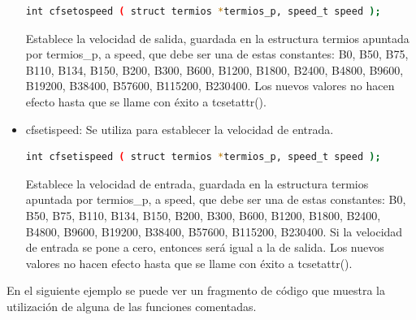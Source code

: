 \documentclass[12pt,twoside]{book}
\begin{document}
\begin{itemize}
\begin{lstlisting}[language=bash]
int cfsetospeed ( struct termios *termios_p, speed_t speed );
\end{lstlisting}
Establece la velocidad de salida, guardada en la estructura termios
apuntada por termios\_p, a speed, que debe ser una de estas constantes:
B0, B50, B75, B110, B134, B150, B200, B300, B600, B1200, B1800,
B2400, B4800, B9600, B19200, B38400, B57600, B115200, B230400.
Los nuevos valores no hacen efecto hasta que se llame con éxito a
tcsetattr().

\item cfsetispeed: Se utiliza para establecer la velocidad de entrada.

\begin{lstlisting}[language=bash]
int cfsetispeed ( struct termios *termios_p, speed_t speed );
\end{lstlisting}
Establece la velocidad de entrada, guardada en la estructura termios
apuntada por termios\_p, a speed, que debe ser una de estas constantes:
B0, B50, B75, B110, B134, B150, B200, B300, B600, B1200, B1800,
B2400, B4800, B9600, B19200, B38400, B57600, B115200, B230400.
Si la velocidad de entrada se pone a cero, entonces será igual a la de
salida. Los nuevos valores no hacen efecto hasta que se llame con éxito a
tcsetattr().
\end{itemize}
En el siguiente ejemplo se puede ver un fragmento de código que muestra la
utilización de alguna de las funciones comentadas.








\end{document}

